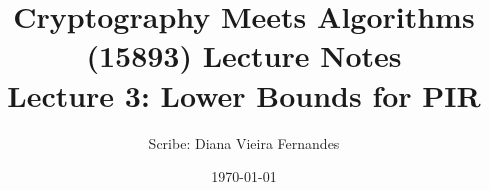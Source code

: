 \documentclass[letterpaper,11pt]{article}
\title{{\Large Cryptography Meets Algorithms (15893) Lecture Notes}\\[5pt]
{\bf Lecture 3: Lower Bounds for PIR}}
\author{Scribe: Diana Vieira Fernandes}
\date{\today}
\theoremstyle{definition}
\begin{document}
\maketitle


{

}


\appendix

\end{document}
